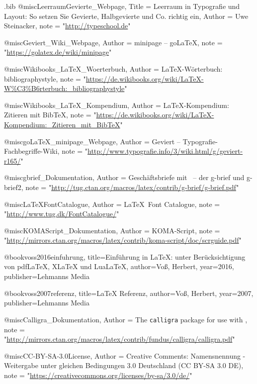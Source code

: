 \documentclass[a4paper,10pt,twoside]{scrbook}
\begin{document}
\begin{filecontents*}{\jobname.bib}
@misc{LeerraumGevierte_Webpage,
        Title = {{Leerraum in Typografie und Layout: So setzen Sie Gevierte, Halbgevierte und Co. richtig ein}},
        Author = {Uwe Steinacker},
        note = "\url{http://typeschool.de}"
}   

@misc{Geviert_Wiki_Webpage,
        Author = {{minipage -- goLaTeX}},
        note = "\url{https://golatex.de/wiki/minipage}"
}

@misc{Wikibooks_LaTeX_Woerterbuch,
	Author = {{LaTeX-Wörterbuch: bibliographystyle}},
	note = "\url{https://de.wikibooks.org/wiki/LaTeX-W%C3%B6rterbuch:_bibliographystyle}"
}

@misc{Wikibooks_LaTeX_Kompendium,
	Author = {{LaTeX-Kompendium: Zitieren mit BibTeX}},
	note = "\url{https://de.wikibooks.org/wiki/LaTeX-Kompendium:_Zitieren_mit_BibTeX}"
	}

        
@misc{goLaTeX_minipage_Webpage,
        Author = {{Geviert -- Typografie-Fachbegriffe-Wiki}},
        note = "\url{http://www.typografie.info/3/wiki.html/g/geviert-r165/}"
}

@misc{gbrief_Dokumentation,
        Author = {{Geschäftsbriefe mit \LaTeXe\ -- der g-brief und g-brief2}},
        note = "\url{http://tug.ctan.org/macros/latex/contrib/g-brief/g-brief.pdf}"
}

@misc{LaTeXFontCatalogue,
        Author = {{\LaTeX\ Font Catalogue}},
        note = "\url{http://www.tug.dk/FontCatalogue/}"
}

        
@misc{KOMAScript_Dokumentation,
        Author = {{KOMA-Script}},
        note = "\url{http://mirrors.ctan.org/macros/latex/contrib/koma-script/doc/scrguide.pdf}"
}

@book{voss2016einfuhrung,
	title={Einführung in LaTeX: unter Berücksichtigung von pdfLaTeX, XLaTeX und LuaLaTeX},
	author={Vo{\ss}, Herbert},
	year={2016},
	publisher={Lehmanns Media}
}

@book{voss2007referenz,
	title={LaTeX Referenz},
	author={Vo{\ss}, Herbert},
	year={2007},
	publisher={Lehmanns Media}
}

@misc{Calligra_Dokumentation,
        Author = {{The \texttt{calligra} package for use with \LaTeXe}},
        note = "\url{http://mirrors.ctan.org/macros/latex/contrib/fundus/calligra/calligra.pdf}"
}

@misc{CC-BY-SA-3.0License,
        Author = {{Creative Comments: Namensnennung - Weitergabe unter gleichen Bedingungen 3.0 Deutschland (CC BY-SA 3.0 DE)}},
        note = "\url{https://creativecommons.org/licenses/by-sa/3.0/de/}"
}


\end{filecontents*}
\end{document}
